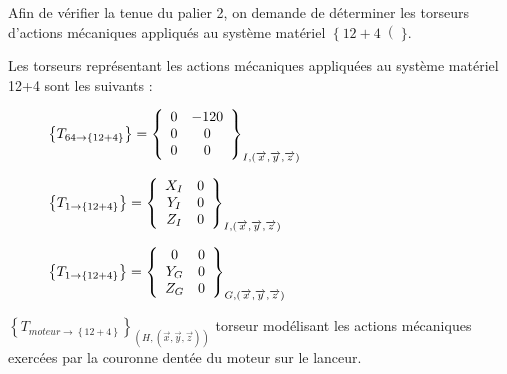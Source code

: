 Afin de vérifier la tenue du palier 2, on demande de déterminer les torseurs d'actions mécaniques appliqués au système matériel $\left\{12+4\right(\}$.

\newpage

Les torseurs représentant les actions mécaniques appliquées au système matériel {12+4} sont les suivants :

\begin{figure}[!h]
  \begin{minipage}{0.48\linewidth}
  \begin{math}
  \left\{T_{64 \rightarrow \left\{12+4\right\}}\right\}=\left\{
  \begin{array}{c c}
  0 & -120 \\
  0 & 0 \\
  0 & 0
  \end{array}\right\}_{I,(\overrightarrow{x},\overrightarrow{y},\overrightarrow{z})}
  \end{math}
  \end{minipage}
  \hfill
  \begin{minipage}{0.48\linewidth}
  \begin{math}
  \left\{T_{1 \rightarrow \left\{12+4\right\}}\right\}=\left\{
  \begin{array}{c c}
  X_I & 0 \\
  Y_I & 0 \\
  Z_I & 0
  \end{array}\right\}_{I,(\overrightarrow{x},\overrightarrow{y},\overrightarrow{z})}
  \end{math}
\end{minipage}
\end{figure}

\begin{figure}[!h]
\begin{math}
  \left\{T_{1 \rightarrow \left\{12+4\right\}}\right\}=\left\{
  \begin{array}{c c}
  0 & 0 \\
  Y_G & 0 \\
  Z_G & 0
  \end{array}\right\}_{G,(\overrightarrow{x},\overrightarrow{y},\overrightarrow{z})}
\end{math}
\end{figure}

$\left\{T_{moteur \rightarrow \left\{12+4\right\}}\right\}_{(H,(\overrightarrow{x},\overrightarrow{y},\overrightarrow{z}))}$ torseur modélisant les actions mécaniques exercées par la couronne dentée du moteur sur le lanceur.

